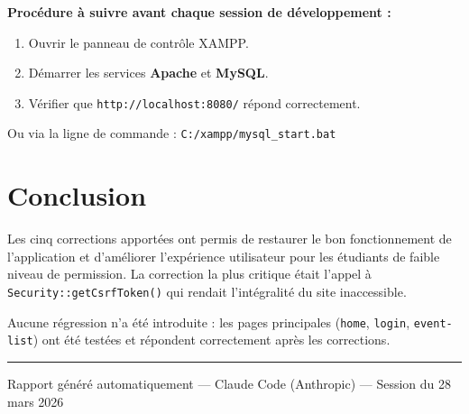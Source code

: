 \documentclass[12pt,a4paper]{article}
\begin{document}
\begin{mdframed}[backgroundcolor=primary!8, linecolor=primary, linewidth=1pt]
\textbf{Procédure à suivre avant chaque session de développement :}
\begin{enumerate}
    \item Ouvrir le panneau de contrôle XAMPP.
    \item Démarrer les services \textbf{Apache} et \textbf{MySQL}.
    \item Vérifier que \texttt{http://localhost:8080/} répond correctement.
\end{enumerate}
Ou via la ligne de commande : \texttt{C:/xampp/mysql\_start.bat}
\end{mdframed}

\section{Conclusion}

Les cinq corrections apportées ont permis de restaurer le bon fonctionnement
de l'application et d'améliorer l'expérience utilisateur pour les étudiants
de faible niveau de permission. La correction la plus critique était
l'appel à \texttt{Security::getCsrfToken()} qui rendait l'intégralité
du site inaccessible.

Aucune régression n'a été introduite : les pages principales
(\texttt{home}, \texttt{login}, \texttt{event-list}) ont été testées
et répondent correctement après les corrections.

\vspace{1cm}
\hrule
\vspace{0.3cm}
{\small\color{gray}
Rapport généré automatiquement — Claude Code (Anthropic) —
Session du 28 mars 2026
}
\end{document}
